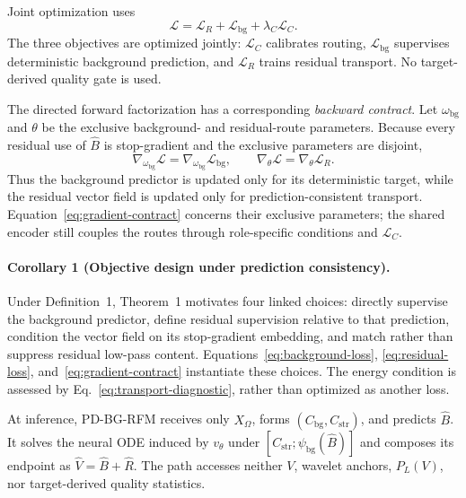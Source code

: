 Joint optimization uses
\begin{equation}
\mathcal L=\mathcal L_R+\mathcal L_{\mathrm{bg}}+\lambda_C\mathcal L_C.
\label{eq:total-loss}
\end{equation}
The three objectives are optimized jointly: $\mathcal L_C$ calibrates routing, $\mathcal L_{\mathrm{bg}}$ supervises deterministic background prediction, and $\mathcal L_R$ trains residual transport. No target-derived quality gate is used.

The directed forward factorization has a corresponding \emph{backward contract}. Let $\omega_{\mathrm{bg}}$ and $\theta$ be the exclusive background- and residual-route parameters. Because every residual use of $\hat B$ is stop-gradient and the exclusive parameters are disjoint,
\begin{equation}
\nabla_{\omega_{\mathrm{bg}}}\mathcal L=\nabla_{\omega_{\mathrm{bg}}}\mathcal L_{\mathrm{bg}},
\qquad
\nabla_{\theta}\mathcal L=\nabla_{\theta}\mathcal L_R.
\label{eq:gradient-contract}
\end{equation}
Thus the background predictor is updated only for its deterministic target, while the residual vector field is updated only for prediction-consistent transport. Equation~\ref{eq:gradient-contract} concerns their exclusive parameters; the shared encoder still couples the routes through role-specific conditions and $\mathcal L_C$.

\paragraph{Corollary 1 (Objective design under prediction consistency).}
Under Definition~1, Theorem~1 motivates four linked choices: directly supervise the background predictor, define residual supervision relative to that prediction, condition the vector field on its stop-gradient embedding, and match rather than suppress residual low-pass content. Equations~\ref{eq:background-loss}, \ref{eq:residual-loss}, and~\ref{eq:gradient-contract} instantiate these choices. The energy condition is assessed by Eq.~\ref{eq:transport-diagnostic}, rather than optimized as another loss.

At inference, PD-BG-RFM receives only $X_\Omega$, forms $(C_{\mathrm{bg}},C_{\mathrm{str}})$, and predicts $\hat B$. It solves the neural ODE \cite{chen2018neuralode} induced by $v_\theta$ under $[C_{\mathrm{str}};\psi_{\mathrm{bg}}(\hat B)]$ and composes its endpoint as $\hat V=\hat B+\hat R$. The path accesses neither $V$, wavelet anchors, $P_L(V)$, nor target-derived quality statistics.

